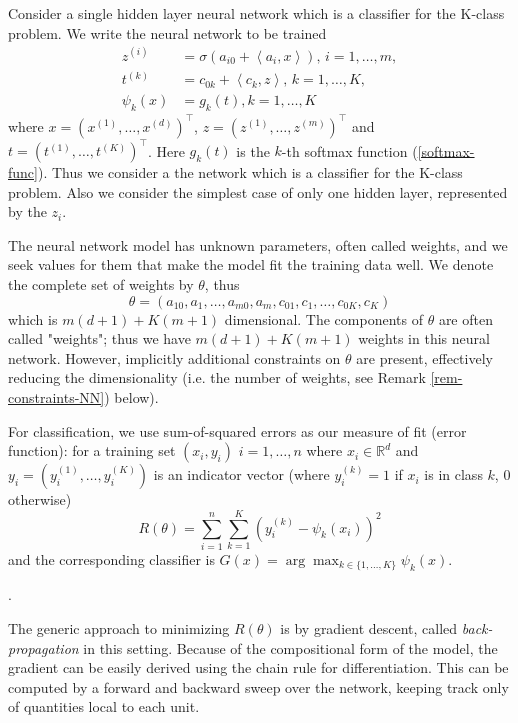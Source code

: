 \documentclass[11pt,twoside]{article}%
\theoremstyle{change}
\begin{document}
Consider a single hidden layer neural network which is a classifier for the
K-class problem. We write the neural network to be trained
\begin{align}
z^{(i)} &  =\sigma\left(  a_{i0}+\left\langle a_{i},x\right\rangle \right)
\text{, }i=1,\ldots,m,\label{nn-HTF-notat}\\
t^{(k)} &  =c_{0k}+\left\langle c_{k},z\right\rangle \text{, }k=1,\ldots
,K,\nonumber\\
\psi_{k}(x) &  =g_{k}(t),k=1,\ldots,K\nonumber
\end{align}
where $x=(x^{(1)},\ldots,x^{(d)})^{\top}$, $z=(z^{(1)},\ldots,z^{(m)})^{\top}$
and $t=(t^{(1)},\ldots,t^{(K)})^{\top}$. Here $g_{k}(t)$ is the $k$-th softmax
function (\ref{softmax-func}). Thus we consider a the network which is a
classifier for the K-class problem. Also we consider the simplest case of only
one hidden layer, represented by the $z_{i}$.

The neural network model has unknown parameters, often called weights, and we
seek values for them that make the model fit the training data well. We denote
the complete set of weights by $\theta$, thus
\[
\theta=\left(  a_{10},a_{1},\ldots,a_{m0},a_{m},c_{01},c_{1},\ldots
,c_{0K},c_{K}\right)
\]
which is $m(d+1)+K(m+1)$ dimensional. The components of $\theta$ are often
called "weights"; thus we have $m(d+1)+K(m+1)$ weights in this neural network.
However, implicitly additional constraints on $\theta$ are present,
effectively reducing the dimensionality (i.e. the number of weights, see
Remark \ref{rem-constraints-NN}) below).

For classification, we use sum-of-squared errors as our measure of fit (error
function): for a training set $(x_{i},y_{i})$ $i=1,\ldots,n$ where $x_{i}%
\in\mathbb{R}^{d}$ and $y_{i}=(y_{i}^{(1)},\ldots,y_{i}^{(K)})$ is an
indicator vector (where $y_{i}^{(k)}=1$ if $x_{i}$ is in class $k$, $0$
otherwise)
\begin{equation}
R(\theta)=\sum_{i=1}^{n}\sum_{k=1}^{K}\left(  y_{i}^{(k)}-\psi_{k}%
(x_{i})\right)  ^{2}\label{least-squares-NN}%
\end{equation}
and the corresponding classifier is $G(x)=\arg\max_{k\in\{1,\ldots,K\}}%
\psi_{k}(x)$.

.

The generic approach to minimizing $R(\theta)$ is by gradient descent, called
\textit{back-propagation} in this setting. Because of the compositional form
of the model, the gradient can be easily derived using the chain rule for
differentiation. This can be computed by a forward and backward sweep over the
network, keeping track only of quantities local to each unit.
\end{document}
